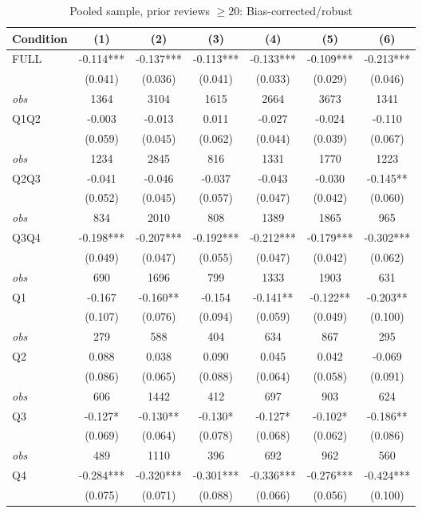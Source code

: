 \begin{table}[!htbp]
\centering
\caption{Pooled sample, prior reviews $\geq20$: Bias-corrected/robust}
\begin{tabular}{lcccccc}
\toprule
Condition & (1) & (2) & (3) & (4) & (5) & (6) \\
\midrule
FULL & -0.114*** & -0.137*** & -0.113*** & -0.133*** & -0.109*** & -0.213*** \\
 & (0.041) & (0.036) & (0.041) & (0.033) & (0.029) & (0.046) \\
\textit{obs} & 1364 & 3104 & 1615 & 2664 & 3673 & 1341 \\
Q1Q2 & -0.003 & -0.013 & 0.011 & -0.027 & -0.024 & -0.110 \\
 & (0.059) & (0.045) & (0.062) & (0.044) & (0.039) & (0.067) \\
\textit{obs} & 1234 & 2845 & 816 & 1331 & 1770 & 1223 \\
Q2Q3 & -0.041 & -0.046 & -0.037 & -0.043 & -0.030 & -0.145** \\
 & (0.052) & (0.045) & (0.057) & (0.047) & (0.042) & (0.060) \\
\textit{obs} & 834 & 2010 & 808 & 1389 & 1865 & 965 \\
Q3Q4 & -0.198*** & -0.207*** & -0.192*** & -0.212*** & -0.179*** & -0.302*** \\
 & (0.049) & (0.047) & (0.055) & (0.047) & (0.042) & (0.062) \\
\textit{obs} & 690 & 1696 & 799 & 1333 & 1903 & 631 \\
Q1 & -0.167 & -0.160** & -0.154 & -0.141** & -0.122** & -0.203** \\
 & (0.107) & (0.076) & (0.094) & (0.059) & (0.049) & (0.100) \\
\textit{obs} & 279 & 588 & 404 & 634 & 867 & 295 \\
Q2 & 0.088 & 0.038 & 0.090 & 0.045 & 0.042 & -0.069 \\
 & (0.086) & (0.065) & (0.088) & (0.064) & (0.058) & (0.091) \\
\textit{obs} & 606 & 1442 & 412 & 697 & 903 & 624 \\
Q3 & -0.127* & -0.130** & -0.130* & -0.127* & -0.102* & -0.186** \\
 & (0.069) & (0.064) & (0.078) & (0.068) & (0.062) & (0.086) \\
\textit{obs} & 489 & 1110 & 396 & 692 & 962 & 560 \\
Q4 & -0.284*** & -0.320*** & -0.301*** & -0.336*** & -0.276*** & -0.424*** \\
 & (0.075) & (0.071) & (0.088) & (0.066) & (0.056) & (0.100) \\

\end{tabular}
\end{table}
